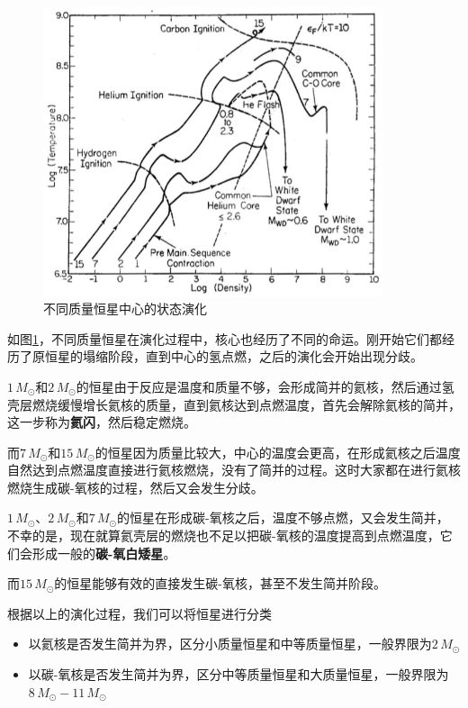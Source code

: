 \documentclass[openany]{ctexbook}
\begin{document}
\begin{figure}[hbt]
  \centering
  \includegraphics[width=10cm]{chapters/13/center}
  \caption{不同质量恒星中心的状态演化}
  \label{fig:center}
\end{figure}

如图\ref{fig:center}，不同质量恒星在演化过程中，核心也经历了不同的命运。刚开始它们都经历了原恒星的塌缩阶段，直到中心的氢点燃，之后的演化会开始出现分歧。

$1\,M_\odot$和$2\,M_\odot$的恒星由于反应是温度和质量不够，会形成简并的氦核，然后通过氢壳层燃烧缓慢增长氦核的质量，直到氦核达到点燃温度，首先会解除氦核的简并，这一步称为\textbf{氦闪}，然后稳定燃烧。

而$7\,M_\odot$和$15\,M_\odot$的恒星因为质量比较大，中心的温度会更高，在形成氦核之后温度自然达到点燃温度直接进行氦核燃烧，没有了简并的过程。这时大家都在进行氦核燃烧生成碳-氧核的过程，然后又会发生分歧。

$1\,M_\odot$、$2\,M_\odot$和$7\,M_\odot$的恒星在形成碳-氧核之后，温度不够点燃，又会发生简并，不幸的是，现在就算氦壳层的燃烧也不足以把碳-氧核的温度提高到点燃温度，它们会形成一般的\textbf{碳-氧白矮星}。

而$15\,M_\odot$的恒星能够有效的直接发生碳-氧核，甚至不发生简并阶段。

根据以上的演化过程，我们可以将恒星进行分类
\begin{itemize}
  \item 以氦核是否发生简并为界，区分小质量恒星和中等质量恒星，一般界限为$2\,M_\odot$
  \item 以碳-氧核是否发生简并为界，区分中等质量恒星和大质量恒星，一般界限为$8\,M_\odot-11\,M_\odot$
\end{itemize}
\end{document}
